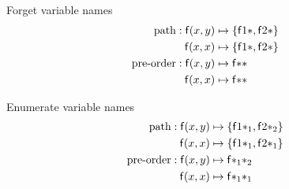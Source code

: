 

	
	\begin{block}{Forget variable names}
		\vspace{-1em}
	\begin{align*}
		\text{path}: {\mathsf f}(x,y)  &\mapsto \{ {\mathsf f} 1 {*}, {\mathsf f} 2 {*} \}\\
			{\mathsf f}(x,x)  &\mapsto \{ {\mathsf f} 1 {*}, {\mathsf f} 2 {*} \}\\
		\text{pre-order}:
		{\mathsf f}(x,y) &\mapsto {\mathsf f} {*} {*} \\
		{\mathsf f}(x,x) &\mapsto {\mathsf f} {*} {*}
			\end{align*}
			\end{block}
%	

\begin{block}{Enumerate variable names}
	\vspace{-1em}	
	\begin{align*}
		\text{path}: {\mathsf f}(x,y)  &\mapsto \{ {\mathsf f} 1 {*_1}, {\mathsf f} 2 {*_2} \}\\
		{\mathsf f}(x,x)  &\mapsto \{ {\mathsf f} 1 {*_1}, {\mathsf f} 2 {*_1} \}\\
		\text{pre-order}:
		{\mathsf f}(x,y) &\mapsto {\mathsf f} {*_1} {*_2} \\
		{\mathsf f}(x,x) &\mapsto {\mathsf f} {*_1} {*_1}
	\end{align*}
	\end{block}